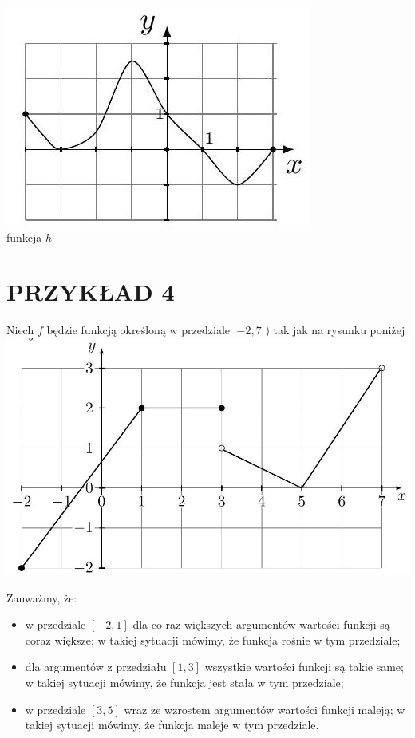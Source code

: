 \documentclass[10pt]{article}
\begin{document}
\begin{enumerate}
\includegraphics[max width=\textwidth, center]{2024_11_21_e9b4faa005d5be2cc318g-127(2)}\\
funkcja \(h\)
\end{enumerate}

\section*{PRZYKŁAD 4}
Niech \(f\) będzie funkcją określoną w przedziale \([-2,7\) ) tak jak na rysunku poniżej\\
\includegraphics[max width=\textwidth, center]{2024_11_21_e9b4faa005d5be2cc318g-127(3)}

Zauważmy, że:

\begin{itemize}
  \item w przedziale \([-2,1]\) dla co raz większych argumentów wartości funkcji są coraz większe; w takiej sytuacji mówimy, że funkcja rośnie w tym przedziale;
  \item dla argumentów z przedziału \([1,3]\) wszystkie wartości funkcji są takie same; w takiej sytuacji mówimy, że funkcja jest stała w tym przedziale;
  \item w przedziale \([3,5]\) wraz ze wzrostem argumentów wartości funkcji maleją; w takiej sytuacji mówimy, że funkcja maleje w tym przedziale.
\end{itemize}
\end{document}
